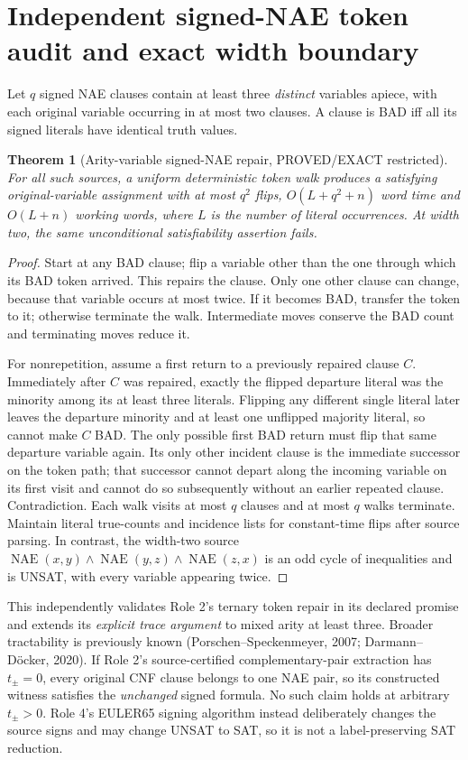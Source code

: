 \documentclass[11pt]{article}
\newtheorem{theorem}{Theorem}
\begin{document}
\section{Independent signed-NAE token audit and exact width boundary}
Let $q$ signed NAE clauses contain at least three \emph{distinct} variables apiece, with each original variable occurring in at most two clauses. A clause is BAD iff all its signed literals have identical truth values.
\begin{theorem}[Arity-variable signed-NAE repair, PROVED/EXACT restricted]
For all such sources, a uniform deterministic token walk produces a satisfying original-variable assignment with at most $q^2$ flips, $O(L+q^2+n)$ word time and $O(L+n)$ working words, where $L$ is the number of literal occurrences. At width two, the same unconditional satisfiability assertion fails.
\end{theorem}
\begin{proof}
Start at any BAD clause; flip a variable other than the one through which its BAD token arrived. This repairs the clause. Only one other clause can change, because that variable occurs at most twice. If it becomes BAD, transfer the token to it; otherwise terminate the walk. Intermediate moves conserve the BAD count and terminating moves reduce it.

For nonrepetition, assume a first return to a previously repaired clause $C$. Immediately after $C$ was repaired, exactly the flipped departure literal was the minority among its at least three literals. Flipping any different single literal later leaves the departure minority and at least one unflipped majority literal, so cannot make $C$ BAD. The only possible first BAD return must flip that same departure variable again. Its only other incident clause is the immediate successor on the token path; that successor cannot depart along the incoming variable on its first visit and cannot do so subsequently without an earlier repeated clause. Contradiction. Each walk visits at most $q$ clauses and at most $q$ walks terminate. Maintain literal true-counts and incidence lists for constant-time flips after source parsing. In contrast, the width-two source
$\operatorname{NAE}(x,y)\wedge\operatorname{NAE}(y,z)\wedge\operatorname{NAE}(z,x)$ is an odd cycle of inequalities and is UNSAT, with every variable appearing twice.
\end{proof}
This independently validates Role 2's ternary token repair in its declared promise and extends its \emph{explicit trace argument} to mixed arity at least three. Broader tractability is previously known (Porschen--Speckenmeyer, 2007; Darmann--D\"ocker, 2020). If Role 2's source-certified complementary-pair extraction has $t_\pm=0$, every original CNF clause belongs to one NAE pair, so its constructed witness satisfies the \emph{unchanged} signed formula. No such claim holds at arbitrary $t_\pm>0$. Role 4's EULER65 signing algorithm instead deliberately changes the source signs and may change UNSAT to SAT, so it is not a label-preserving SAT reduction.
\end{document}
